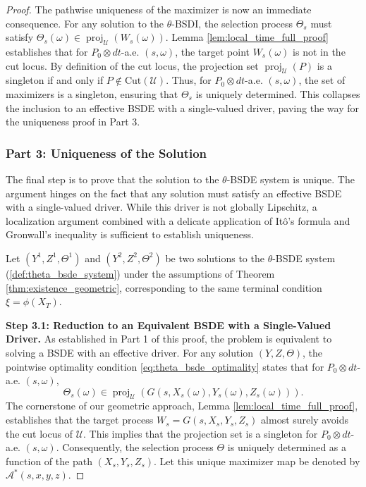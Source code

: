 \documentclass[12pt, letterpaper]{amsart}
\newcommand{\Thetacal}{\mathcal{A}}
\newcommand{\Ucal}{\mathcal{U}}
\DeclareMathOperator*{\proj}{proj}
\theoremstyle{plain}
\theoremstyle{definition}
\theoremstyle{remark}
\numberwithin{equation}{section} %
\begin{document}
\begin{proof}
The pathwise uniqueness of the maximizer is now an immediate consequence. For any solution to the $\theta$-BSDI, the selection process $\Theta_s$ must satisfy $\Theta_s(\omega) \in \proj_{\Ucal}(W_s(\omega))$. Lemma \ref{lem:local_time_full_proof} establishes that for $P_0 \otimes dt$-a.e. $(s,\omega)$, the target point $W_s(\omega)$ is not in the cut locus. By definition of the cut locus, the projection set $\proj_{\Ucal}(P)$ is a singleton if and only if $P \notin \mathrm{Cut}(\Ucal)$. Thus, for $P_0 \otimes dt$-a.e. $(s,\omega)$, the set of maximizers is a singleton, ensuring that $\Theta_s$ is uniquely determined. This collapses the inclusion to an effective BSDE with a single-valued driver, paving the way for the uniqueness proof in Part 3.



\subsubsection*{\textbf{Part 3: Uniqueness of the Solution}}
The final step is to prove that the solution to the \(\theta\)-BSDE system is unique. The argument hinges on the fact that any solution must satisfy an effective BSDE with a single-valued driver. While this driver is not globally Lipschitz, a localization argument combined with a delicate application of Itô's formula and Gronwall's inequality is sufficient to establish uniqueness.

Let \((Y^1, Z^1, \Theta^1)\) and \((Y^2, Z^2, \Theta^2)\) be two solutions to the \(\theta\)-BSDE system (\cref{def:theta_bsde_system}) under the assumptions of Theorem \ref{thm:existence_geometric}, corresponding to the same terminal condition $\xi = \phi(X_T)$.

\vspace{1ex}
\noindent\textbf{Step 3.1: Reduction to an Equivalent BSDE with a Single-Valued Driver.}
As established in Part 1 of this proof, the problem is equivalent to solving a BSDE with an effective driver. For any solution $(Y,Z,\Theta)$, the pointwise optimality condition \eqref{eq:theta_bsde_optimality} states that for $P_0 \otimes dt$-a.e. $(s,\omega)$,
\[
    \Theta_s(\omega) \in \proj_{\Ucal}(G(s,X_s(\omega),Y_s(\omega),Z_s(\omega))).
\]
The cornerstone of our geometric approach, Lemma \ref{lem:local_time_full_proof}, establishes that the target process $W_s = G(s,X_s,Y_s,Z_s)$ almost surely avoids the cut locus of $\Ucal$. This implies that the projection set is a singleton for $P_0 \otimes dt$-a.e. $(s,\omega)$.
Consequently, the selection process $\Theta$ is uniquely determined as a function of the path $(X_s, Y_s, Z_s)$. Let this unique maximizer map be denoted by $\Thetacal^*(s,x,y,z)$.


\end{proof}
\end{document}
